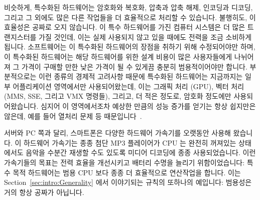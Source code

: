 비슷하게, 특수화된 하드웨어는 암호화와 복호화, 압축과 압축 해제, 인코딩과
디코딩, 그리고 그 외에도 많은 다른 작업들을 더 효율적으로 처리할 수 있습니다.
불행히도, 이 효율성은 공짜로 오지 않습니다.
이 특수 하드웨어를 가진 컴퓨터 시스템은 더 많은 트랜지스터를 가질 것인데, 이는
실제 사용되지 않고 있을 때에도 전력을 조금 소비하게 됩니다.
소프트웨어는 이 특수화된 하드웨어의 장점을 취하기 위해 수정되어야만 하며, 이
특수화된 하드웨어는 해당 하드웨어를 위한 설계 비용이 많은 사용자들에게 나뉘어져
그 가격이 구매할 만한 낮은 가격이 될 수 있게끔 충분히 범용적이어야만 합니다.
부분적으로는 이런 종류의 경제적 고려사항 때문에 특수화된 하드웨어는 지금까지는
일부 어플리케이션 영역에서만 사용되어왔는데, 이는 그래픽 처리 (GPU), 벡터 처리
(MMS, SSE, 그리고 VMX 명령들), 그리고, 더 적은 정도로, 암호화 정도에만
사용되어왔습니다.
심지어 이 영역에서조차 예상한 만큼의 성능 증가를 얻기는 항상 쉽지만은 않은데,
예를 들어 열처리 문제 등
때문입니다~\cite{VladKrasnov2017SIMDfreqscale,DanielLemire2018SIMDfreqscale,TravisDowns2020SIMDfreqscale}.

\iffalse

Similarly, specialized hardware can more efficiently encrypt and decrypt,
compress and decompress, encode and decode, and many other tasks besides.
Unfortunately, this efficiency does not come for free.
A computer system incorporating this specialized hardware will contain
more transistors, which will consume some power even when not in use.
Software must be modified to take advantage of this specialized hardware,
and this specialized hardware must be sufficiently generally useful
that the high up-front hardware-design costs can be spread over enough
users to make the specialized hardware affordable.
In part due to these sorts of economic considerations, specialized
hardware has thus far appeared only for a few application areas,
including graphics processing (GPUs), vector processors (MMX, SSE,
and VMX instructions), and, to a lesser extent, encryption.
And even in these areas, it is not always easy to realize the expected
performance gains, for example, due to thermal
throttling~\cite{VladKrasnov2017SIMDfreqscale,DanielLemire2018SIMDfreqscale,TravisDowns2020SIMDfreqscale}.

\fi

서버와 PC 쪽과 달리, 스마트폰은 다양한 하드웨어 가속기를 오랫동안 사용해
왔습니다.
이 하드웨어 가속기는 종종 첨단 MP3 플레이어가 CPU 는 완전히 꺼져있는 상태에서도
음악을 수분간 재생할 수도 있도록 미디어 디코딩에 종종 사용되었습니다.
이런 가속기들의 목표는 전력 효율을 개선시키고 배터리 수명을 늘리기
위함이었습니다: 특수 목적 하드웨어는 범용 CPU 보다 종종 더 효율적으로
연산작업을 합니다.
이는 Section~\ref{sec:intro:Generality} 에서 이야기되는 규칙의 또하나의
예입니다: 범용성은 거의 항상 공짜가 아닙니다.

